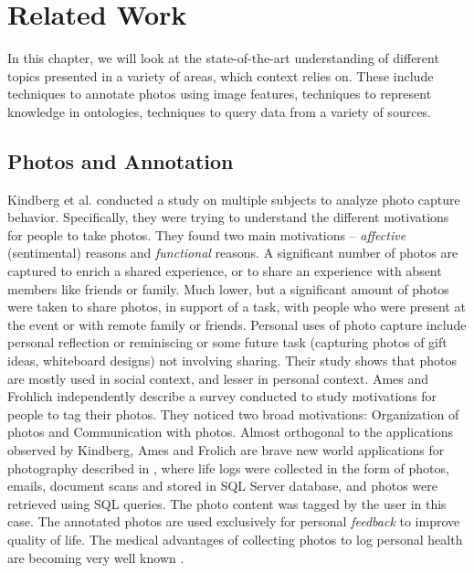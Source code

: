 \chapter{Related Work}

In this chapter, we will look at the state-of-the-art understanding of different topics presented in a variety of areas, which context relies on. These include techniques to annotate photos using image features, techniques to represent knowledge in ontologies, techniques to query data from a variety of sources.

\section{Photos and Annotation}

Kindberg et al. \cite{kindberg2005ubiquitous} conducted a study on multiple subjects to analyze photo capture behavior. Specifically, they were trying to understand the different motivations for people to take photos. They found two main motivations -- \textit{affective} (sentimental) reasons and \textit{functional} reasons. A significant number of photos are captured to enrich a shared experience, or to share an experience with absent members like friends or family. Much lower, but a significant amount of photos were taken to share photos, in support of a task, with people who were present at the event or with remote family or friends. Personal uses of photo capture include personal reflection or reminiscing or some future task (capturing photos of gift ideas, whiteboard designs) not involving sharing. Their study shows that photos are mostly used in social context, and lesser in personal context. Ames \cite{ames2007we} and Frohlich \cite{frohlich2002requirements} independently describe a survey conducted to study motivations for people to tag their photos. They noticed two broad motivations: Organization of photos and Communication with photos. Almost orthogonal to the applications observed by Kindberg, Ames and Frolich are brave new world applications for photography described in \cite{gemmell2002mylifebits, dumais2003stuff}, where life logs were collected in the form of photos, emails, document scans and stored in SQL Server database, and photos were retrieved using SQL queries. The photo content was tagged by the user in this case. The annotated photos are used exclusively for personal \textit{feedback} to improve quality of life. The medical advantages of collecting photos to log personal health are becoming very well known \cite{bell2010total}.

